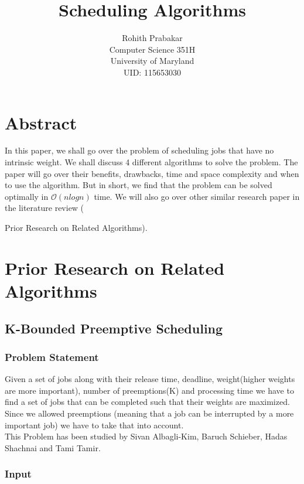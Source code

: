 \documentclass[11pt]{article}
\begin{document}
	
	\title {Scheduling Algorithms}
	\author
	{    Rohith Prabakar\\
		Computer Science 351H\\
		University of Maryland\\
		UID: 115653030
	}
	\maketitle
	
	
	\section{Abstract}
	In this paper, we shall go over the problem of scheduling jobs that have no intrinsic weight.
	We shall discuss 4 different algorithms to solve the problem. The paper will go over their benefits, drawbacks, time and space complexity and when to use the algorithm. But in short, we find that the problem can be solved optimally in  $\mathcal{O}(nlogn)$ time. We will also go over other similar research paper in the literature review ({Prior Research on Related Algorithms).
		
		\section{Prior Research on Related Algorithms}
		
		\subsection{K-Bounded Preemptive Scheduling}
		
		\subsubsection{Problem Statement}
		Given a set of jobs along with their release time,  deadline, weight(higher weights are more important), number of preemptions(K) and processing time we have to find a set of jobs that can be completed such that their weights are maximized.\\
		Since we allowed preemptions (meaning that a job can be interrupted by a more important job) we have to take that into account.\\
		This Problem has been studied by Sivan Albagli-Kim, Baruch Schieber, Hadas Shachnai and Tami Tamir.
		
		\subsubsection{Input}
		
}
\end{document}
